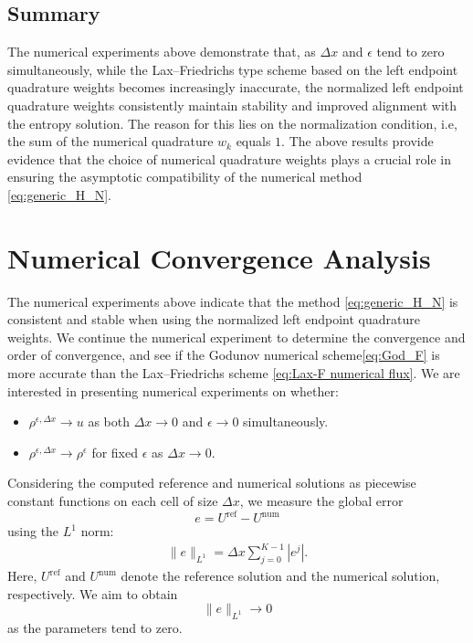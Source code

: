 \subsection*{Summary}
The numerical experiments above demonstrate that, as $\Delta x$ and $\epsilon$ tend to zero simultaneously, while the Lax--Friedrichs type scheme based on the left endpoint quadrature weights becomes increasingly inaccurate, the normalized left endpoint quadrature weights consistently maintain stability and improved alignment with the entropy solution. The reason for this lies on the normalization condition, i.e, the sum of the numerical quadrature $w_k$ equals $1$. The above results provide evidence that the choice of numerical quadrature weights plays a crucial role in ensuring the asymptotic compatibility of the numerical method \eqref{eq:generic_H_N}.

\section{Numerical Convergence Analysis}\label{sec:Convergence_analysis}
The numerical experiments above indicate that the method \eqref{eq:generic_H_N} is consistent and stable when using the normalized left endpoint quadrature weights. We continue the numerical experiment to determine the convergence and order of convergence, and see if the Godunov numerical scheme\eqref{eq:God_F} is more accurate than the Lax--Friedrichs scheme \eqref{eq:Lax-F numerical flux}.
We are interested in presenting numerical experiments on whether:
\begin{itemize}
    \item $\rho^{\epsilon, \Delta x} \rightarrow u$ as both $\Delta x \rightarrow 0$ and $\epsilon \rightarrow 0$ simultaneously.
    \item $\rho^{\epsilon, \Delta x} \rightarrow \rho^{\epsilon}$ for fixed $\epsilon$ as $\Delta x \rightarrow 0$.
\end{itemize}

Considering the computed reference and numerical solutions as piecewise constant functions on each cell of size $\Delta x$, we measure the global error
\[
    e = U^{\mathrm{ref}} - U^{\mathrm{num}}
\]
using the $L^{1}$ norm:
\begin{align*}
    \| e \|_{L^{1}} = \Delta x \sum_{j=0}^{K-1} |e^j|.
\end{align*}
Here, $U^{\mathrm{ref}}$ and $U^{\mathrm{num}}$ denote the reference solution and the numerical solution, respectively. We aim to obtain
\[
    \| e \|_{L^{1}} \rightarrow 0
\]
as the parameters tend to zero.

